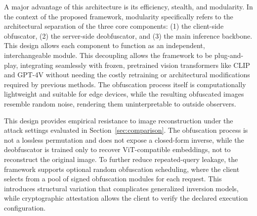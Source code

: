 \documentclass{ieeeaccess}
\newcommand{\rev}[1]{{\color{green}#1}}
\begin{document}
A major advantage of this architecture is its efficiency, stealth, and modularity. In the context of the proposed framework, modularity specifically refers to the architectural separation of the three core components: (1) the client-side obfuscator, (2) the server-side deobfuscator, and (3) the main inference backbone. This design allows each component to function as an independent, interchangeable module. This decoupling allows the framework to be plug-and-play, integrating seamlessly with frozen, pretrained vision transformers like CLIP and GPT-4V without needing the costly retraining or architectural modifications required by previous methods. The obfuscation process itself is computationally lightweight and suitable for edge devices, while the resulting obfuscated images resemble random noise, rendering them uninterpretable to outside observers.

\rev{This design provides empirical resistance to image reconstruction under the attack settings evaluated in Section~\ref{sec:comparison}. The obfuscation process is not a lossless permutation and does not expose a closed-form inverse, while the deobfuscator is trained only to recover ViT-compatible embeddings, not to reconstruct the original image. To further reduce repeated-query leakage, the framework supports optional random obfuscation scheduling, where the client selects from a pool of signed obfuscation modules for each request. This introduces structural variation that complicates generalized inversion models, while cryptographic attestation allows the client to verify the declared execution configuration.}


\end{document}
